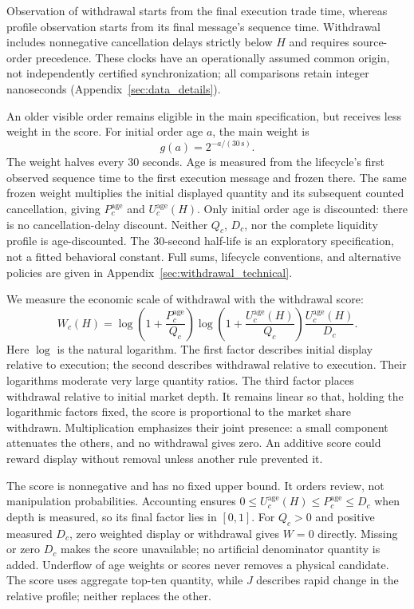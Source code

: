 Observation of withdrawal starts from the final execution trade time, whereas profile observation starts from its final message's sequence time. Withdrawal includes nonnegative cancellation delays strictly below $H$ and requires source-order precedence. These clocks have an operationally assumed common origin, not independently certified synchronization; all comparisons retain integer nanoseconds (Appendix~\ref{sec:data_details}).

An older visible order remains eligible in the main specification, but receives less weight in the score. For initial order age $a$, the main weight is
\begin{equation}
    g(a)=2^{-a/(30\,\mathrm{s})}.
    \label{eq:shared_order_age_weight}
\end{equation}
The weight halves every 30 seconds. Age is measured from the lifecycle's first observed sequence time to the first execution message and frozen there. The same frozen weight multiplies the initial displayed quantity and its subsequent counted cancellation, giving $P_c^{\mathrm{age}}$ and $U_c^{\mathrm{age}}(H)$. Only initial order age is discounted: there is no cancellation-delay discount. Neither $Q_c$, $D_c$, nor the complete liquidity profile is age-discounted. The 30-second half-life is an exploratory specification, not a fitted behavioral constant. Full sums, lifecycle conventions, and alternative policies are given in Appendix~\ref{sec:withdrawal_technical}.

We measure the economic scale of withdrawal with the withdrawal score:
\begin{equation}
    W_c(H)=
      \log\!\left(1+\frac{P_c^{\mathrm{age}}}{Q_c}\right)
      \log\!\left(1+\frac{U_c^{\mathrm{age}}(H)}{Q_c}\right)
      \frac{U_c^{\mathrm{age}}(H)}{D_c}.
    \label{eq:wmsci_market_age}
\end{equation}
Here $\log$ is the natural logarithm. The first factor describes initial display relative to execution; the second describes withdrawal relative to execution. Their logarithms moderate very large quantity ratios. The third factor places withdrawal relative to initial market depth. It remains linear so that, holding the logarithmic factors fixed, the score is proportional to the market share withdrawn. Multiplication emphasizes their joint presence: a small component attenuates the others, and no withdrawal gives zero. An additive score could reward display without removal unless another rule prevented it.

The score is nonnegative and has no fixed upper bound. It orders review, not manipulation probabilities. Accounting ensures $0\leq U_c^{\mathrm{age}}(H)\leq P_c^{\mathrm{age}}\leq D_c$ when depth is measured, so its final factor lies in $[0,1]$. For $Q_c>0$ and positive measured $D_c$, zero weighted display or withdrawal gives $W=0$ directly. Missing or zero $D_c$ makes the score unavailable; no artificial denominator quantity is added. Underflow of age weights or scores never removes a physical candidate. The score uses aggregate top-ten quantity, while $J$ describes rapid change in the relative profile; neither replaces the other.

